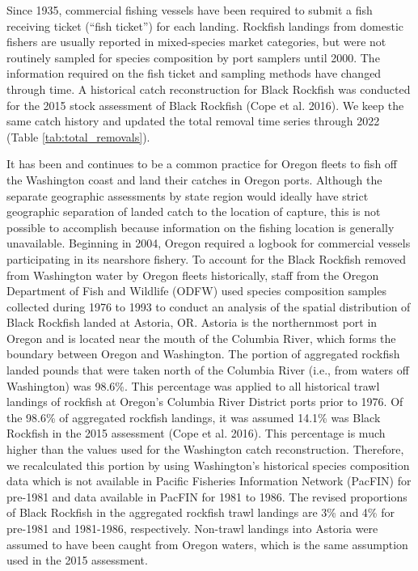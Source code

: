 \documentclass[11pt,
  english,
  letterpaper,
]{article}
\begin{document}
Since 1935, commercial fishing vessels have been required to submit a fish receiving ticket (``fish ticket'') for each landing. Rockfish landings from domestic fishers are usually reported in mixed-species market categories, but were not routinely sampled for species composition by port samplers until 2000. The information required on the fish ticket and sampling methods have changed through time. A historical catch reconstruction for Black Rockfish was conducted for the 2015 stock assessment of Black Rockfish (Cope et al. 2016). We keep the same catch history and updated the total removal time series through 2022 (Table \ref{tab:total_removals}).

It has been and continues to be a common practice for Oregon fleets to fish off the Washington coast and land their catches in Oregon ports. Although the separate geographic assessments by state region would ideally have strict geographic separation of landed catch to the location of capture, this is not possible to accomplish because information on the fishing location is generally unavailable. Beginning in 2004, Oregon required a logbook for commercial vessels participating in its nearshore fishery. To account for the Black Rockfish removed from Washington water by Oregon fleets historically, staff from the Oregon Department of Fish and Wildlife (ODFW) used species composition samples collected during 1976 to 1993 to conduct an analysis of the spatial distribution of Black Rockfish landed at Astoria, OR. Astoria is the northernmost port in Oregon and is located near the mouth of the Columbia River, which forms the boundary between Oregon and Washington. The portion of aggregated rockfish landed pounds that were taken north of the Columbia River (i.e., from waters off Washington) was 98.6\%. This percentage was applied to all historical trawl landings of rockfish at Oregon's Columbia River District ports prior to 1976. Of the 98.6\% of aggregated rockfish landings, it was assumed 14.1\% was Black Rockfish in the 2015 assessment (Cope et al. 2016). This percentage is much higher than the values used for the Washington catch reconstruction. Therefore, we recalculated this portion by using Washington's historical species composition data which is not available in Pacific Fisheries Information Network (PacFIN) for pre-1981 and data available in PacFIN for 1981 to 1986. The revised proportions of Black Rockfish in the aggregated rockfish trawl landings are 3\% and 4\% for pre-1981 and 1981-1986, respectively. Non-trawl landings into Astoria were assumed to have been caught from Oregon waters, which is the same assumption used in the 2015 assessment.
\end{document}
